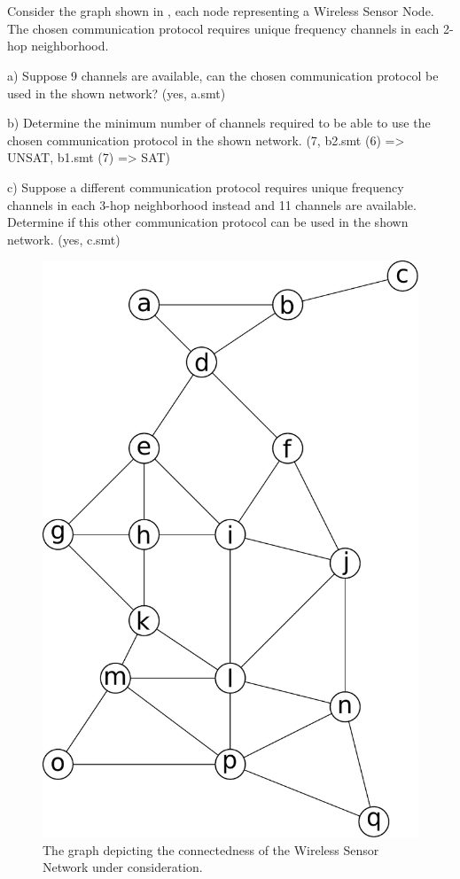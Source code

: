 \chapter{}\label{chp:4}

Consider the graph shown in , each node representing a Wireless Sensor Node. The chosen communication protocol requires unique frequency channels in each 2-hop neighborhood.

a) Suppose 9 channels are available, can the chosen communication protocol be used in the shown network?
(yes, a.smt)

b) Determine the minimum number of channels required to be able to use the chosen communication protocol in the shown network.
(7, b2.smt (6) => UNSAT, b1.smt (7) => SAT)

c) Suppose a different communication protocol requires unique frequency channels in each 3-hop neighborhood instead and 11 channels are available. Determine if this other communication protocol can be used in the shown network.
(yes, c.smt)

\begin{figure}[H]
    \centering
    \includegraphics[width=\columnwidth]{8/graph.pdf}
    \caption{The graph depicting the connectedness of the Wireless Sensor Network under consideration.}
    \label{fig:8}
\end{figure}
